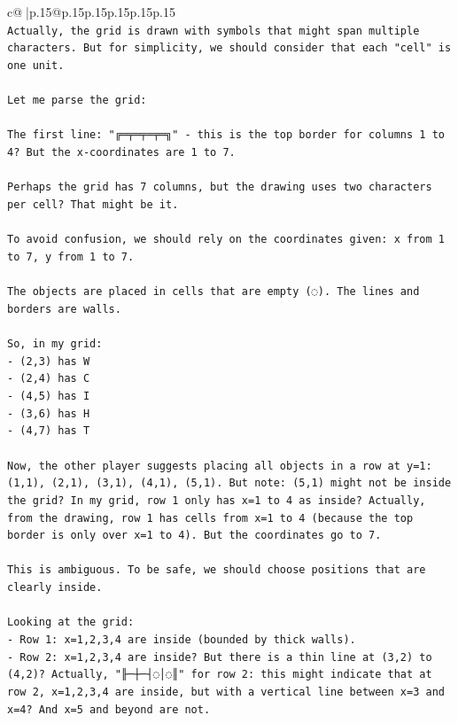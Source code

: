 \documentclass{article}
\begin{document}
{\begin{supertabular}{c@{$\;$}|p{.15\linewidth}@{}p{.15\linewidth}p{.15\linewidth}p{.15\linewidth}p{.15\linewidth}p{.15\linewidth}}
{{{\\ 
\texttt{Actually, the grid is drawn with symbols that might span multiple characters. But for simplicity, we should consider that each "cell" is one unit.} \\
\\ 
\texttt{Let me parse the grid:} \\
\\ 
\texttt{The first line: "╔═╤═╤═╤═╗" {-} this is the top border for columns 1 to 4? But the x{-}coordinates are 1 to 7.} \\
\\ 
\texttt{Perhaps the grid has 7 columns, but the drawing uses two characters per cell? That might be it.} \\
\\ 
\texttt{To avoid confusion, we should rely on the coordinates given: x from 1 to 7, y from 1 to 7.} \\
\\ 
\texttt{The objects are placed in cells that are empty (◌). The lines and borders are walls.} \\
\\ 
\texttt{So, in my grid:} \\
\texttt{{-} (2,3) has W} \\
\texttt{{-} (2,4) has C} \\
\texttt{{-} (4,5) has I} \\
\texttt{{-} (3,6) has H} \\
\texttt{{-} (4,7) has T} \\
\\ 
\texttt{Now, the other player suggests placing all objects in a row at y=1: (1,1), (2,1), (3,1), (4,1), (5,1). But note: (5,1) might not be inside the grid? In my grid, row 1 only has x=1 to 4 as inside? Actually, from the drawing, row 1 has cells from x=1 to 4 (because the top border is only over x=1 to 4). But the coordinates go to 7.} \\
\\ 
\texttt{This is ambiguous. To be safe, we should choose positions that are clearly inside.} \\
\\ 
\texttt{Looking at the grid:} \\
\texttt{{-} Row 1: x=1,2,3,4 are inside (bounded by thick walls).} \\
\texttt{{-} Row 2: x=1,2,3,4 are inside? But there is a thin line at (3,2) to (4,2)? Actually, "╟─┼─┤◌│◌║" for row 2: this might indicate that at row 2, x=1,2,3,4 are inside, but with a vertical line between x=3 and x=4? And x=5 and beyond are not.} \\
}}}
\end{supertabular}}
\end{document}
